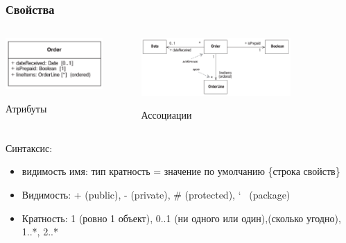 \documentclass[xetex,mathserif,serif]{beamer}
\begin{document}
	\begin{frame}
		\frametitle{Свойства}
		\begin{columns}
			\begin{column}{0.3\textwidth}
				\begin{center}
					\includegraphics[width=0.8\textwidth]{attributes.png}

					Атрибуты
				\end{center}
			\end{column}
			\begin{column}{0.7\textwidth}
				\begin{center}
					\includegraphics[width=0.7\textwidth]{associations.png}

					Ассоциации
				\end{center}
			\end{column}
		\end{columns}
		\bigskip
		Синтаксис:
		\begin{itemize}
			\item видимость имя: тип кратность = значение по умолчанию \{строка свойств\}
			\item Видимость: + (public), - (private), \# (protected), \char`~ (package)
			\item Кратность: 1 (ровно 1 объект), 0..1 (ни одного или один),\newline * (сколько угодно), 1..*, 2..*
		\end{itemize}
	\end{frame}
\end{document}
